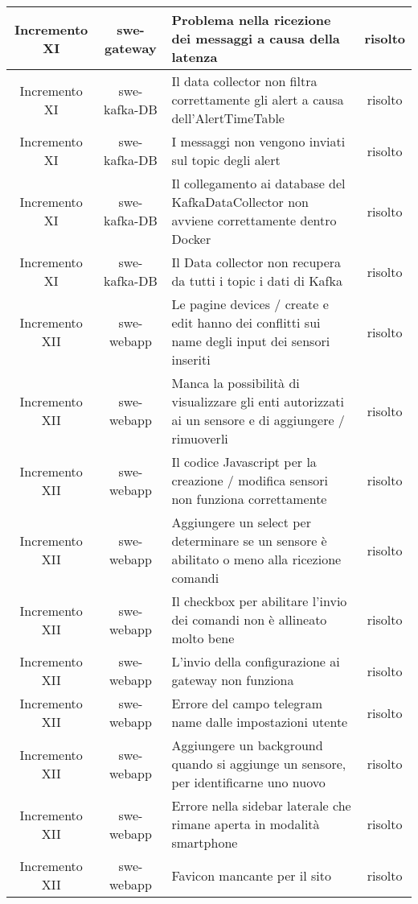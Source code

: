 \begin{center}
\begin{longtable}{|c|c|p{8cm}|c|}
	    \hline
	    Incremento XI & swe-gateway & Problema nella ricezione dei messaggi a causa della latenza  & risolto \\
	    \hline
	    Incremento XI & swe-kafka-DB & Il data collector non filtra correttamente gli alert a causa dell'AlertTimeTable & risolto \\
	    \hline
	    Incremento XI & swe-kafka-DB & I messaggi non vengono inviati sul topic degli alert & risolto \\
	    \hline
	    Incremento XI & swe-kafka-DB & Il collegamento ai database del KafkaDataCollector non avviene correttamente dentro Docker & risolto \\
	    \hline
	    Incremento XI & swe-kafka-DB & Il Data collector non recupera da tutti i topic i dati di Kafka & risolto \\
	    \hline
	    Incremento XII & swe-webapp & Le pagine devices / create e edit hanno dei conflitti sui name degli input dei sensori inseriti & risolto \\
	    \hline
	    Incremento XII & swe-webapp & Manca la possibilità di visualizzare gli enti autorizzati ai un sensore e di aggiungere / rimuoverli & risolto \\
	    \hline
	    Incremento XII & swe-webapp & Il codice Javascript per la creazione / modifica sensori non funziona correttamente & risolto \\
	    \hline
	    Incremento XII & swe-webapp & Aggiungere un select per determinare se un sensore è abilitato o meno alla ricezione comandi & risolto \\
	    \hline
	    Incremento XII & swe-webapp & Il checkbox per abilitare l'invio dei comandi non è allineato molto bene & risolto \\
	    \hline
	    Incremento XII & swe-webapp & L'invio della configurazione ai gateway non funziona & risolto \\
	    \hline
	    Incremento XII & swe-webapp & Errore del campo telegram name dalle impostazioni utente  & risolto \\
	    \hline
	    Incremento XII & swe-webapp & Aggiungere un background quando si aggiunge un sensore, per identificarne uno nuovo & risolto \\
	    \hline
	    Incremento XII & swe-webapp & Errore nella sidebar laterale che rimane aperta in modalità smartphone  & risolto \\
	    \hline
	    Incremento XII & swe-webapp & Favicon mancante per il sito & risolto \\
	    \hline

\end{longtable}
\end{center}
